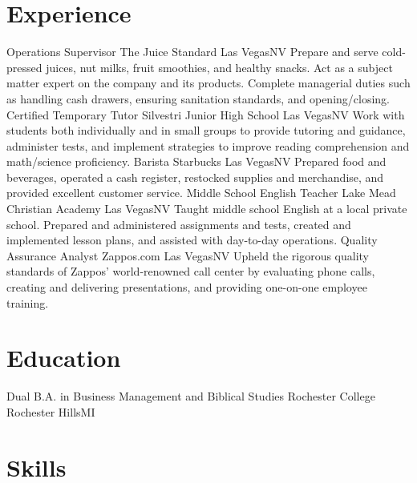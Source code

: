 \documentclass[11pt]{moderncv}
\title{}
\begin{document}
\maketitle
\section{Experience}
			{Operations Supervisor}
			{The Juice Standard}
			{Las Vegas}{NV}
			{Prepare and serve cold-pressed juices, nut milks, fruit smoothies, and healthy snacks. Act as a subject matter expert on the company and its products. Complete managerial duties such as handling cash drawers, ensuring sanitation standards, and opening/closing.}
			{Certified Temporary Tutor}
			{Silvestri Junior High School}
			{Las Vegas}{NV}
			{Work with students both individually and in small groups to provide tutoring and guidance, administer tests, and implement strategies to improve reading comprehension and math/science proficiency.}
			{Barista}
			{Starbucks}
			{Las Vegas}{NV}
			{Prepared food and beverages, operated a cash register, restocked supplies and merchandise, and provided excellent customer service.}
			{Middle School English Teacher}
			{Lake Mead Christian Academy}
			{Las Vegas}{NV}
			{Taught middle school English at a local private school. Prepared and administered assignments and tests, created and implemented lesson plans, and assisted with day-to-day operations.}
			{Quality Assurance Analyst}
			{Zappos.com}
			{Las Vegas}{NV}
			{Upheld the rigorous quality standards of Zappos' world-renowned call center by evaluating phone calls, creating and delivering presentations, and providing one-on-one employee training.}
\section{Education}
			{Dual B.A. in Business Management and Biblical Studies}
			{Rochester College}
			{Rochester Hills}{MI}
			{}
\section{Skills}
\end{document}
